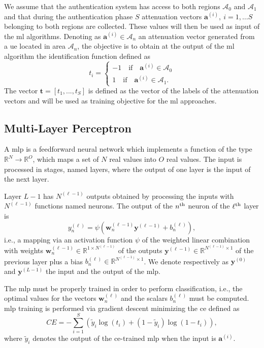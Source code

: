 \documentclass[twocolumns]{IEEEtran}
\begin{document}
We assume that the authentication system has access to both regions $\mathcal{A}_0$ and $\mathcal{A}_1$ and that during the authentication phase $S$ attenuation vectors $\bm{a}^{(i)}, \ i=1,\dots S$  belonging to both regions are collected. These values will then be used as input of the \ac{ml} algorithms. Denoting as $\bm{a}^{(i)}\in \mathcal{A}_n$ an attenuation vector generated from a \ac{ue} located in area $\mathcal{A}_{n}$, the objective is to obtain at the output of the \ac{ml} algorithm the identification function defined as
\begin{equation}
  t_i =
  \begin{cases}
  -1 \quad \text{if} \quad \bm{a}^{(i)} \in \mathcal{A}_0\\
  1 \quad \text{if} \quad \bm{a}^{(i)} \in \mathcal{A}_1.
  \end{cases}
\end{equation}
The vector $\bm{t}=[t_1,...,t_S]$ is defined as the vector of the labels of the attenuation vectors and will be used as training objective for the \ac{ml} approaches.

\subsection{Multi-Layer Perceptron}\label{sec:nn}

A \ac{mlp} is a feedforward neural network which implements a function of the type $\mathbb{R}^N \to \mathbb{R}^O$, which maps a set of $N$ real values into $O$ real values. The input is processed in stages, named layers, where the output of one layer is the input of the next layer.

Layer $L-1$ has $N^{(\ell-1)}$ outputs obtained by processing the inputs with $N^{(\ell-1)}$ functions named neurons. The output of the $n^{\rm th}$ neuron of the $\ell^{\rm th}$ layer is
\begin{equation}\label{eq:nonLin}
y_n^{(\ell)} = \psi\left( \bm{w}_n^{(\ell -1)}\bm{y}^{(\ell-1)}+b_n^{(\ell)} \right),
\end{equation}
i.e., a mapping via an activation function $\psi$ of the weighted linear combination with weights $\bm{w}_n^{(\ell -1)}\in \mathbb{R}^{1\times N^{(\ell-1)}}$ of the outputs $\bm{y}^{(\ell-1)} \in \mathbb{R}^{N^{(\ell-1)} \times 1 }$ of the previous layer plus a bias $b_n^{(\ell)} \in \mathbb{R}^{N^{(\ell-1)} \times 1 }$. We denote respectively as $\bm{y}^{(0)}$ and $\bm{y}^{(L-1)}$ the input and the output of the \ac{mlp}. 

The \ac{mlp} must be properly trained in order to perform classification, i.e., the optimal values for the vectors $\bm{w}_n^{(\ell)}$ and the scalars $b_n^{(\ell)}$ must be computed. \Ac{mlp} training is performed via gradient descent minimizing the \ac{ce} defined as
\begin{equation}\label{eq:ce}
CE = -\sum_{i=1}^{S}\left(\tilde{y}_i\log\left(t_i\right)+\left(1-\tilde{y}_i\right)\log\left(1-t_i\right) \right),
\end{equation}
where $\tilde{y}_i$ denotes the output of the \ac{ce}-trained \ac {mlp} when the input is $\bm{a}^{(i)}$.
\end{document}
